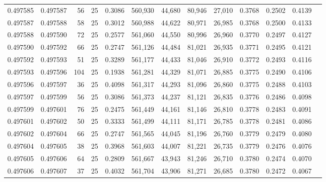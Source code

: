 \begin{tabular}{rrrrrrrrrrrrr}
0.497585 & 0.497587 &    56 &  25 &                                     0.3086 & 560,930 &  44,680 &  80,946 &  27,010 & 0.3768 & 0.2502 & 0.4139 \\
0.497587 & 0.497588 &    58 &  25 &                                     0.3012 & 560,988 &  44,622 &  80,971 &  26,985 & 0.3768 & 0.2500 & 0.4133 \\
0.497588 & 0.497590 &    72 &  25 &                                     0.2577 & 561,060 &  44,550 &  80,996 &  26,960 & 0.3770 & 0.2497 & 0.4127 \\
0.497590 & 0.497592 &    66 &  25 &                                     0.2747 & 561,126 &  44,484 &  81,021 &  26,935 & 0.3771 & 0.2495 & 0.4121 \\
0.497592 & 0.497593 &    51 &  25 &                                     0.3289 & 561,177 &  44,433 &  81,046 &  26,910 & 0.3772 & 0.2493 & 0.4116 \\
0.497593 & 0.497596 &   104 &  25 &                                     0.1938 & 561,281 &  44,329 &  81,071 &  26,885 & 0.3775 & 0.2490 & 0.4106 \\
0.497596 & 0.497597 &    36 &  25 &                                     0.4098 & 561,317 &  44,293 &  81,096 &  26,860 & 0.3775 & 0.2488 & 0.4103 \\
0.497597 & 0.497599 &    56 &  25 &                                     0.3086 & 561,373 &  44,237 &  81,121 &  26,835 & 0.3776 & 0.2486 & 0.4098 \\
0.497599 & 0.497601 &    76 &  25 &                                     0.2475 & 561,449 &  44,161 &  81,146 &  26,810 & 0.3778 & 0.2483 & 0.4091 \\
0.497601 & 0.497602 &    50 &  25 &                                     0.3333 & 561,499 &  44,111 &  81,171 &  26,785 & 0.3778 & 0.2481 & 0.4086 \\
0.497602 & 0.497604 &    66 &  25 &                                     0.2747 & 561,565 &  44,045 &  81,196 &  26,760 & 0.3779 & 0.2479 & 0.4080 \\
0.497604 & 0.497605 &    38 &  25 &                                     0.3968 & 561,603 &  44,007 &  81,221 &  26,735 & 0.3779 & 0.2476 & 0.4076 \\
0.497605 & 0.497606 &    64 &  25 &                                     0.2809 & 561,667 &  43,943 &  81,246 &  26,710 & 0.3780 & 0.2474 & 0.4070 \\
0.497606 & 0.497607 &    37 &  25 &                                     0.4032 & 561,704 &  43,906 &  81,271 &  26,685 & 0.3780 & 0.2472 & 0.4067 \\

\end{tabular}
